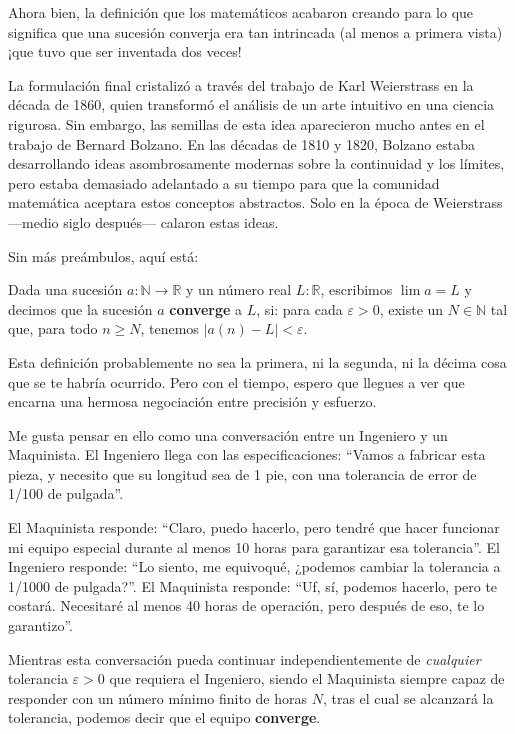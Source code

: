 Ahora bien, la definición que los matemáticos acabaron creando para lo
que significa que una sucesión converja era tan intrincada (al menos a
primera vista) ¡que tuvo que ser inventada dos veces!

La formulación final cristalizó a través del trabajo de Karl Weierstrass
en la década de 1860, quien transformó el análisis de un arte intuitivo
en una ciencia rigurosa. Sin embargo, las semillas de esta idea
aparecieron mucho antes en el trabajo de Bernard Bolzano. En las décadas
de 1810 y 1820, Bolzano estaba desarrollando ideas asombrosamente
modernas sobre la continuidad y los límites, pero estaba demasiado
adelantado a su tiempo para que la comunidad matemática aceptara estos
conceptos abstractos. Solo en la época de Weierstrass —medio siglo
después— calaron estas ideas.

Sin más preámbulos, aquí está:

\begin{definicion}
  Dada una sucesión $a : \mathbb{N} \to \mathbb{R}$ y un número real
  $L : \mathbb{R}$, escribimos $\lim a = L$ y decimos que la sucesión
  $a$ \textbf{converge} a $L$, si: para cada $\varepsilon > 0$, existe un
  $N \in \mathbb{N}$ tal que, para todo $n \geq N$, tenemos $|a(n) - L| < \varepsilon$.
\end{definicion}

Esta definición probablemente no sea la primera, ni la segunda, ni la
décima cosa que se te habría ocurrido. Pero con el tiempo, espero que
llegues a ver que encarna una hermosa negociación entre precisión y
esfuerzo.

Me gusta pensar en ello como una conversación entre un Ingeniero y un
Maquinista. El Ingeniero llega con las especificaciones: ``Vamos a
fabricar esta pieza, y necesito que su longitud sea de 1 pie, con una
tolerancia de error de 1/100 de pulgada''.

El Maquinista responde: ``Claro, puedo hacerlo, pero tendré que hacer
funcionar mi equipo especial durante al menos 10 horas para garantizar
esa tolerancia''. El Ingeniero responde: ``Lo siento, me equivoqué,
¿podemos cambiar la tolerancia a 1/1000 de pulgada?''. El Maquinista
responde: ``Uf, sí, podemos hacerlo, pero te costará. Necesitaré al
menos 40 horas de operación, pero después de eso, te lo garantizo''.

Mientras esta conversación pueda continuar independientemente de
\textit{cualquier} tolerancia $\varepsilon > 0$ que requiera el Ingeniero, siendo
el Maquinista siempre capaz de responder con un número mínimo finito de
horas $N$, tras el cual se alcanzará la tolerancia, podemos decir que el
equipo \textbf{converge}.

